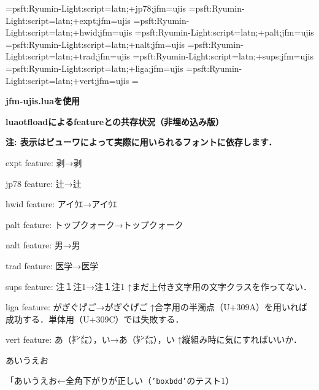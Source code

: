 

\let\tengoth=\tengt
\jfont\jisse={psft:Ryumin-Light:script=latn;+jp78;jfm=ujis}
\jfont\jisexpt={psft:Ryumin-Light:script=latn;+expt;jfm=ujis}
\jfont\jishwid={psft:Ryumin-Light:script=latn;+hwid;jfm=ujis}
\jfont\jispalt={psft:Ryumin-Light:script=latn;+palt;jfm=ujis}
\jfont\jisnalt={psft:Ryumin-Light:script=latn;+nalt;jfm=ujis}
\jfont\jistrad={psft:Ryumin-Light:script=latn;+trad;jfm=ujis}
\jfont\jissups={psft:Ryumin-Light:script=latn;+sups;jfm=ujis}
\jfont\jisliga={psft:Ryumin-Light:script=latn;+liga;jfm=ujis}
\jfont\jisvert={psft:Ryumin-Light:script=latn;+vert;jfm=ujis}
\parskip=\smallskipamount{}\zw

{\noindent\bf\tengoth jfm-ujis.luaを使用}

\bigskip

{\noindent\bf\tengoth luaotf\/loadによるfeatureとの共存状況（非埋め込み版）}

{\noindent\bf\tengoth 注: 表示はビューワによって実際に用いられるフォントに依存します．}

{\tentt expt} feature: 剥→{\jisexpt 剥}

{\tentt jp78} feature: 辻→{\jisse 辻}

{\tentt hwid} feature: アイｳｴ→{\jishwid アイｳｴ}

{\tentt palt} feature: トップクォーク→{\jispalt トップクォーク}\hfil\break

{\tentt nalt} feature: 男→{\jisnalt 男}

{\tentt trad} feature: 医学→{\jistrad 医学}

{\tentt sups} feature: 注１注1→{\jissups 注１注1}\hfil\break
↑まだ上付き文字用の文字クラスを作ってない．

{\tentt liga} feature: か゚き゚く゚け゚こ゚→{\jisliga か゚き゚く゚け゚こ゚}\hfil\break
↑合字用の半濁点（{\tentt U+309A}）を用いれば成功する．単体用（{\tentt U+309C}）では失敗する．%

{\tentt vert} feature: あ（㌢㍍），い→{\jisvert あ（㌢㍍），い}\hfil\break
↑縦組み時に気にすればいいか．

\bigskip

\noindent あいうえお

「あいうえお←全角下がりが正しい（{\tt'boxbdd'}のテスト1）

